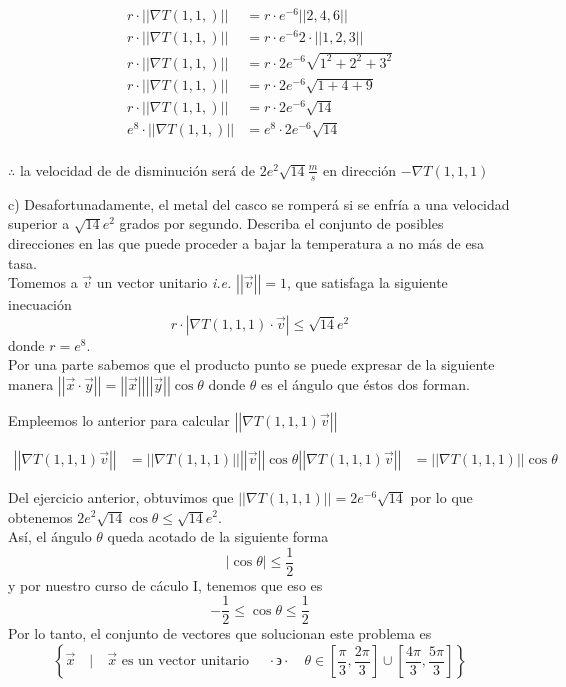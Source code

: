 \documentclass[letterpaper]{article}
\providecommand{\abs}[1]{\left|#1\right|}
\providecommand{\norm}[1]{\left|\left|#1\right|\right|}
\newcommand{\tq}{ \quad \cdot  \backepsilon \cdot \quad }
\renewcommand{\*}{\cdot}
\theoremstyle{definition}
\begin{document}
\begin{align*}
	r\*\norm{\nabla T(1,1,)} &= r\* e^{-6}\norm{2,4,6}\\
	r\*\norm{\nabla T(1,1,)} &= r\* e^{-6}2\*\norm{1,2,3}\\
	r\*\norm{\nabla T(1,1,)} &= r\* 2e^{-6}\sqrt{1^2 + 2^2 + 3^2}\\
	r\*\norm{\nabla T(1,1,)} &= r\* 2e^{-6}\sqrt{1+4+9}\\
	r\*\norm{\nabla T(1,1,)} &= r\* 2e^{-6}\sqrt{14}\\
	e^8\*\norm{\nabla T(1,1,)} &= e^8\* 2e^{-6}\sqrt{14}\\
\end{align*}
\begin{center}
	$ \therefore $ la velocidad de de disminución será de $ 2e^2\sqrt{14} \frac{m}{s}$ en dirección $ - \nabla T(1,1,1) $ \\
\end{center}


c) Desafortunadamente, el metal del casco se romperá si se enfría a una velocidad superior a $\sqrt{14}e^2$ grados por segundo. Describa el conjunto de posibles direcciones en las que puede proceder a bajar la temperatura a no más de esa tasa.\\

Tomemos a $ \vec{v} $ un vector unitario \textit{i.e.} $ \norm{\vec{v}} = 1 $, que satisfaga la siguiente inecuación
\[ r\* \abs{\nabla T(1,1,1) \* \vec{v}} \leq \sqrt{14}e^2 \]
donde $ r = e^8 $.\\

Por una parte sabemos que el producto punto se puede expresar de la siguiente manera $ \norm{\vec{x} \* \vec{y}} = \norm{\vec{x}}\norm{\vec{y}}\cos\theta $ donde $ \theta $ es el ángulo que éstos dos forman. 

Empleemos lo anterior para calcular $ \norm{\nabla T(1,1,1) \vec{v} } $

\begin{align*}
	 \norm{\nabla T(1,1,1) \vec{v} } &= \norm{\nabla T(1,1,1)} \norm{\vec{v}}\cos\theta
	 \norm{\nabla T(1,1,1) \vec{v} } &= \norm{\nabla T(1,1,1)}\cos\theta
\end{align*}

Del ejercicio anterior, obtuvimos que $ \norm{\nabla T(1,1,1)} =  2e^{-6}\sqrt{14} $  por lo que obtenemos $ 2e^{2}\sqrt{14} \cos\theta \leq \sqrt{14}e^2$.\\

Así, el ángulo $  \theta $ queda acotado de la siguiente forma
\[ \abs{\cos \theta} \leq \dfrac{1}{2} \] y por nuestro curso de cáculo I, tenemos que eso es \[  -\dfrac{1}{2} \leq \cos \theta \leq \dfrac{1}{2} \]
Por lo tanto, el conjunto de vectores que solucionan este problema es 
\[ \left\lbrace \vec{x} \quad | \quad \vec{x} \text{ es un vector unitario } \tq \theta \in \left[ \dfrac{\pi}{3}, \dfrac{2\pi}{3} \right] \cup \left[ \dfrac{4\pi}{3}, \dfrac{5\pi}{3} \right]  \right\rbrace \]
\end{document}
